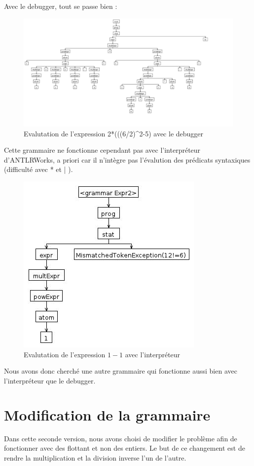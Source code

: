 \documentclass[11pt,a4paper]{article}
\begin{document}
Avec le debugger, tout se passe bien :\\
\begin{figure}[h!]\caption{Evalutation de l'expression 2*(((6/2)\^{}2-5) avec le debugger}
\centering
\includegraphics[scale=0.3]{figures/arbre_v1_debugger.jpg}
\end{figure}

Cette grammaire ne fonctionne cependant pas avec l'interpréteur d'ANTLRWorks, a priori car il n'intègre pas l'évalution des prédicats syntaxiques (difficulté avec * et | ).
\begin{figure}[h!]\caption{Evalutation de l'expression $1-1$ avec l'interpréteur}
\centering
\includegraphics[scale=0.5]{figures/arbre_v1_interpreter.jpg}
\end{figure}
Nous avons donc cherché une autre grammaire qui fonctionne aussi bien avec l'interpréteur que le debugger.

\part{Modification de la grammaire}
Dans cette seconde version, nous avons choisi de modifier le problème afin de fonctionner avec des flottant et non des entiers. Le but de ce changement est de rendre la multiplication et la division inverse l'un de l'autre.\\
\end{document}
